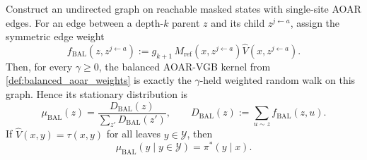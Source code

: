 \documentclass{article}
\numberwithin{theorem}{section}
\numberwithin{proposition}{section}
\numberwithin{corollary}{section}
\numberwithin{lemma}{section}
\numberwithin{conjecture}{section}
\numberwithin{remark}{section}
\numberwithin{definition}{section}
\numberwithin{assumption}{section}
\numberwithin{example}{section}
\newcommand{\calY}{{\mathcal{Y}}}
\begin{document}
\begin{theorem}
\label{thm:balanced_weighted_graph}
Construct an undirected graph on reachable masked states with single-site AOAR edges. For an edge between a depth-$k$ parent $z$ and its child $z^{j\leftarrow a}$, assign the symmetric edge weight
\begin{equation*}
    f_{\mathrm{BAL}}(z,z^{j\leftarrow a}) := g_{k+1}\, M_{\text{ref}}(x,z^{j\leftarrow a}) \widehat V(x,z^{j\leftarrow a}).
\end{equation*}
Then, for every $\gamma\ge 0$, the balanced AOAR-VGB kernel from \cref{def:balanced_aoar_weights} is exactly the $\gamma$-held weighted random walk on this graph. Hence its stationary distribution is
\begin{equation*}
    \mu_{\mathrm{BAL}}(z)=\frac{D_{\mathrm{BAL}}(z)}{\sum_{z'}D_{\mathrm{BAL}}(z')}, \qquad
    D_{\mathrm{BAL}}(z) := \sum_{u\sim z} f_{\mathrm{BAL}}(z,u).
\end{equation*}
If $\widehat V(x,y)=\tau(x,y)$ for all leaves $y\in\calY$, then
\begin{equation*}
    \mu_{\mathrm{BAL}}(y\mid y\in\calY) = \pi^*(y\mid x).
\end{equation*}
\end{theorem}
\end{document}
